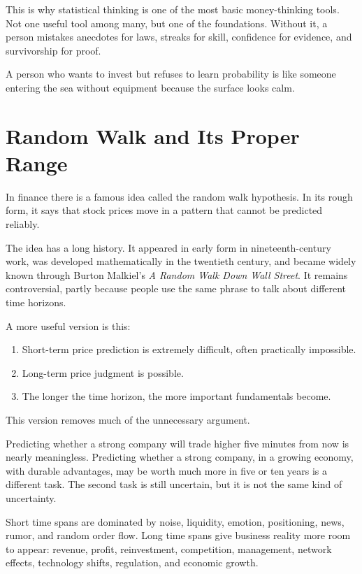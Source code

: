 This is why statistical thinking is one of the most basic money-thinking tools. Not one useful tool among many, but one of the foundations. Without it, a person mistakes anecdotes for laws, streaks for skill, confidence for evidence, and survivorship for proof.

A person who wants to invest but refuses to learn probability is like someone entering the sea without equipment because the surface looks calm.

\section*{Random Walk and Its Proper Range}

In finance there is a famous idea called the random walk hypothesis. In its rough form, it says that stock prices move in a pattern that cannot be predicted reliably.

The idea has a long history. It appeared in early form in nineteenth-century work, was developed mathematically in the twentieth century, and became widely known through Burton Malkiel's \emph{A Random Walk Down Wall Street}. It remains controversial, partly because people use the same phrase to talk about different time horizons.

A more useful version is this:

\begin{enumerate}
\item Short-term price prediction is extremely difficult, often practically impossible.
\item Long-term price judgment is possible.
\item The longer the time horizon, the more important fundamentals become.
\end{enumerate}

This version removes much of the unnecessary argument.

Predicting whether a strong company will trade higher five minutes from now is nearly meaningless. Predicting whether a strong company, in a growing economy, with durable advantages, may be worth much more in five or ten years is a different task. The second task is still uncertain, but it is not the same kind of uncertainty.

Short time spans are dominated by noise, liquidity, emotion, positioning, news, rumor, and random order flow. Long time spans give business reality more room to appear: revenue, profit, reinvestment, competition, management, network effects, technology shifts, regulation, and economic growth.

